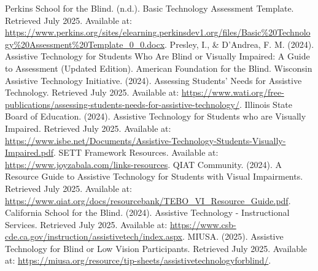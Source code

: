 \begin{thebibliography}{99}
 Perkins School for the Blind. (n.d.). Basic Technology Assessment Template. Retrieved July 2025. Available at: \url{https://www.perkins.org/sites/elearning.perkinsdev1.org/files/Basic\%20Technology\%20Assessment\%20Template\_0\_0.docx}.
 Presley, I., \& D'Andrea, F. M. (2024). Assistive Technology for Students Who Are Blind or Visually Impaired: A Guide to Assessment (Updated Edition). American Foundation for the Blind.
 Wisconsin Assistive Technology Initiative. (2024). Assessing Students' Needs for Assistive Technology. Retrieved July 2025. Available at: \url{https://www.wati.org/free-publications/assessing-students-needs-for-assistive-technology/}.
 Illinois State Board of Education. (2024). Assistive Technology for Students who are Visually Impaired. Retrieved July 2025. Available at: \url{https://www.isbe.net/Documents/Assistive-Technology-Students-Visually-Impaired.pdf}.
 SETT Framework Resources. Available at: \url{https://www.joyzabala.com/links-resources}.
 QIAT Community. (2024). A Resource Guide to Assistive Technology for Students with Visual Impairments. Retrieved July 2025. Available at: \url{https://www.qiat.org/docs/resourcebank/TEBO_VI_Resource_Guide.pdf}.
 California School for the Blind. (2024). Assistive Technology - Instructional Services. Retrieved July 2025. Available at: \url{https://www.csb-cde.ca.gov/instruction/assistivetech/index.aspx}.
 MIUSA. (2025). Assistive Technology for Blind or Low Vision Participants. Retrieved July 2025. Available at: \url{https://miusa.org/resource/tip-sheets/assistivetechnologyforblind/}.
\end{thebibliography}
